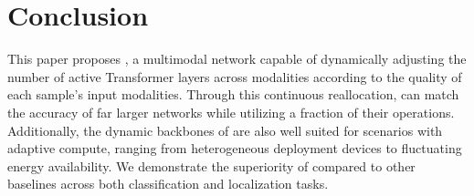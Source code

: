 \section{Conclusion}

This paper proposes \name, a multimodal network capable of dynamically adjusting the number of active Transformer layers across modalities according to the quality of each sample's input modalities. Through this continuous reallocation, \name can match the accuracy of far larger networks while utilizing a fraction of their operations. Additionally, the dynamic backbones of \name are also well suited for scenarios with adaptive compute, ranging from heterogeneous deployment devices to fluctuating energy availability. We demonstrate the superiority of \name compared to other baselines across both classification and localization tasks. 


